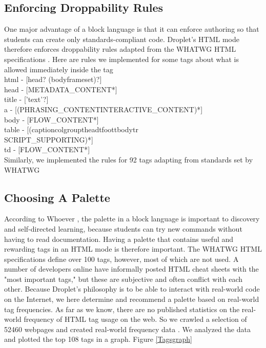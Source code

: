 \documentclass[conference]{IEEEtran}
\begin{document}
\subsection{Enforcing Droppability Rules}
One major advantage of a block language is that it can enforce authoring so that students can create only standards-compliant code. Droplet's HTML mode therefore enforces droppability rules adapted from the WHATWG HTML specifications \cite{WHATWG}. Here are rules we implemented for some tags about what is allowed immediately inside the tag\\
html - [head? (body\textbar frameset)?]\\
head - [METADATA\_CONTENT*] \cite{metadata}\\
title - ['text'?]\\
a - [(PHRASING\_CONTENT\textbar INTERACTIVE\_CONTENT)*] \cite{phrasing} \cite{interactive}\\
body - [FLOW\_CONTENT*] \cite{flowcontent}\\
table - [(caption\textbar colgroup\textbar thead\textbar tfoot\textbar tbody\textbar tr\textbar \\ SCRIPT\_SUPPORTING)*] \cite{script}\\
td - [FLOW\_CONTENT*] \cite{flowcontent}\\
Similarly, we implemented the rules for 92 tags adapting from standards set by WHATWG \cite{WHATWG}

\subsection{Choosing A Palette}

According to Whoever \cite{Whoever}, the palette in a block language is important to discovery and self-directed learning, because students can try new commands without having to read documentation. Having a palette that contains useful and rewarding tags in an HTML mode is therefore important. The WHATWG HTML specifications define over 100 tags, however, most of which are not used. A number of developers online have informally posted HTML cheat sheets with the "most important tags," \cite{Webmonkey} \cite{SimpleGuide} \cite{Usabilla} but these are subjective and often conflict with each other. Because Droplet's philosophy is to be able to interact with real-world code on the Internet, we here determine and recommend a palette based on real-world tag frequencies. As far as we know, there are no published statistics on the real-world frequency of HTML tag usage on the web.  So we crawled a selection of 52460 webpages and created real-world frequency data \cite{FullResults}. We analyzed the data and plotted the top 108 tags in a graph. Figure \ref{Tagsgraph}
\end{document}
